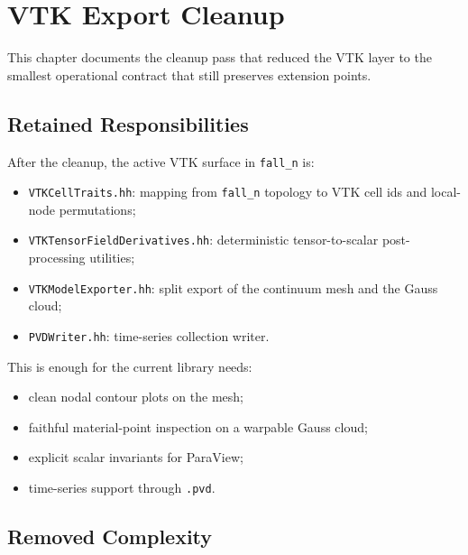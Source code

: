 
\chapter{VTK Export Cleanup}
\label{ch:vtk_cleanup}

This chapter documents the cleanup pass that reduced the VTK layer to the
smallest operational contract that still preserves extension points.


\section{Retained Responsibilities}
\label{sec:vtk_cleanup_retained}

After the cleanup, the active VTK surface in \texttt{fall\_n} is:
\begin{itemize}[nosep]
  \item \texttt{VTKCellTraits.hh}: mapping from \texttt{fall\_n} topology to
        VTK cell ids and local-node permutations;
  \item \texttt{VTKTensorFieldDerivatives.hh}: deterministic tensor-to-scalar
        post-processing utilities;
  \item \texttt{VTKModelExporter.hh}: split export of the continuum mesh and
        the Gauss cloud;
  \item \texttt{PVDWriter.hh}: time-series collection writer.
\end{itemize}

This is enough for the current library needs:
\begin{itemize}[nosep]
  \item clean nodal contour plots on the mesh;
  \item faithful material-point inspection on a warpable Gauss cloud;
  \item explicit scalar invariants for ParaView;
  \item time-series support through \texttt{.pvd}.
\end{itemize}


\section{Removed Complexity}
\label{sec:vtk_cleanup_removed}

